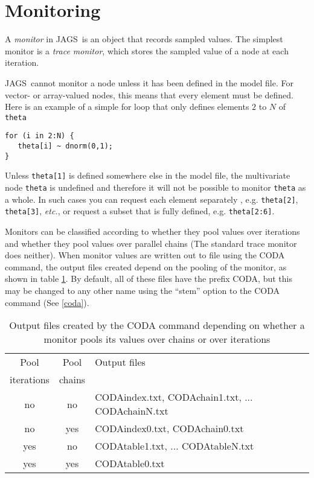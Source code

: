 \documentclass[11pt, a4paper, titlepage]{report}
\newcommand{\JAGS}{\textsf{JAGS}}
\begin{document}
\section{Monitoring}
\label{section:monitoring}

A {\em monitor} in \JAGS\ is an object that records sampled
values. The simplest monitor is a {\em trace monitor}, which stores
the sampled value of a node at each iteration.

\JAGS\ cannot monitor a node unless it has been defined in the model
file.  For vector- or array-valued nodes, this means that every
element must be defined. Here is an example of a simple for loop that
only defines elements $2$ to $N$ of \verb+theta+

\begin{verbatim}
for (i in 2:N) {
   theta[i] ~ dnorm(0,1);
}
\end{verbatim}

Unless \verb+theta[1]+ is defined somewhere else in the model file,
the multivariate node \verb+theta+ is undefined and therefore it
will not be possible to monitor \verb+theta+ as a whole.  In such
cases you can request each element separately , e.g. \verb+theta[2]+,
\verb+theta[3]+, {\em etc.}, or request a subset that is fully defined,
e.g. \verb+theta[2:6]+.

Monitors can be classified according to whether they pool values over
iterations and whether they pool values over parallel chains (The
standard trace monitor does neither). When monitor values are written
out to file using the CODA command, the output files created depend
on the pooling of the monitor, as shown in table \ref{table:coda}. By
default, all of these files have the prefix CODA, but this may be changed
to any other name using the ``stem'' option to the CODA command
(See \ref{coda}).

\begin{table}[h]
\begin{tabular}{ccl}
\hline
Pool       & Pool   & Output files \\
iterations & chains &              \\
\hline
no         & no     & CODAindex.txt, CODAchain1.txt, ... 
                      CODAchainN.txt \\
no         & yes    & CODAindex0.txt, CODAchain0.txt \\
yes        & no     & CODAtable1.txt, ... CODAtableN.txt \\
yes        & yes    & CODAtable0.txt \\
\hline
\end{tabular}
\caption{Output files created by the CODA command depending on whether
a monitor pools its values over chains or over iterations \label{table:coda}}
\end{table}
\end{document}
